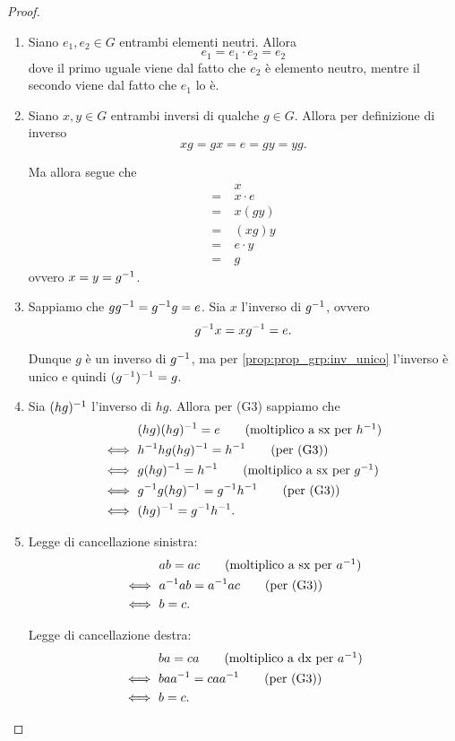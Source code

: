 \begin{proof}
    \begin{enumerate}[label={(\roman*)}]
        \item Siano $e_1, e_2 \in G$ entrambi elementi neutri. Allora \[
            e_1 = e_1 \cdot e_2 = e_2    
        \] dove il primo uguale viene dal fatto che $e_2$ è elemento neutro, mentre il secondo viene dal fatto che $e_1$ lo è.
        \item Siano $x, y \in G$ entrambi inversi di qualche $g \in G$. Allora per definizione di inverso \[
            xg = gx = e = gy = yg.    
        \]

        Ma allora segue che \begin{align*}
            &x \tag*{(el. neutro)}\\
            =\ &x \cdot e \tag*{($e = gy$)}\\
            =\ &x(gy) \tag*{(per (G1))}\\
            =\ &(xg)y \tag*{($xg = e$)}\\
            =\ &e \cdot y \tag*{(el. neutro)}\\
            =\ &g
        \end{align*} ovvero $x = y = g^{-1}$.
        \item Sappiamo che $gg^{-1} = g^{-1} g = e$. Sia $x$ l'inverso di $g^{-1}$, ovvero \[
            g^{-1} x = xg^{-1} = e.    
        \]
        
        Dunque $g$ è un inverso di $g^{-1}$, ma per \ref{prop:prop_grp:inv_unico} l'inverso è unico e quindi $(g^{-1})^{-1} = g$.
        \item Sia $(hg)^{-1}$ l'inverso di $hg$. Allora per (G3) sappiamo che \begin{align*}
            &(hg)(hg)\inv = e \tag*{(moltiplico a sx per $h\inv$)} \\
            \iff\ &h\inv hg(hg)\inv = h\inv \tag*{(per (G3))}\\
            \iff\ &g(hg)\inv = h\inv \tag*{(moltiplico a sx per $g\inv$)} \\
            \iff\ &g\inv g(hg)\inv = g\inv h\inv \tag*{(per (G3))}\\
            \iff\ &(hg)\inv = g\inv h\inv.
        \end{align*}
        \item Legge di cancellazione sinistra: \begin{align*}
            &ab = ac \tag*{(moltiplico a sx per $a\inv$)} \\
            \iff\ &a\inv ab = a\inv ac \tag*{(per (G3))} \\
            \iff\ &b = c.
        \end{align*}

        Legge di cancellazione destra: \begin{align*}
            &ba = ca \tag*{(moltiplico a dx per $a\inv$)} \\
            \iff\ & ba a\inv = ca a\inv \tag*{(per (G3))} \\
            \iff\ &b = c. \tag*{\qedhere}
        \end{align*}
    \end{enumerate}
\end{proof}